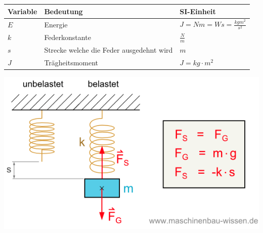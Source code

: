 \documentclass[
a4paper,
oneside,
landscape, 
8pt,
]{scrartcl}
\begin{document}
\begin{multicols*}{2}
\begin{tabbing}
	\begin{tabu} to \linewidth {l X l}
		Variable & Bedeutung & SI-Einheit \\
		\midrule
		$E$ & Energie & $J = Nm = Ws = \frac{kgm^2}{s^2}$ \\
		$k$ & Federkonstante & $\frac{N}{m}$  \\
		$s$ & Strecke welche die Feder ausgedehnt wird & $m$ \\
		$J$ & Trägheitsmoment & $J = kg \cdot m^2$ \\
		\bottomrule
	\end{tabu}
\end{tabbing}

\begin{minipage}[h!]{0.4\linewidth}
\includegraphics[width=\linewidth]{images/federenergie}
\end{minipage}
\hfill
\begin{minipage}[h!]{0.2\linewidth}

\end{minipage}
\end{multicols*}
\end{document}
